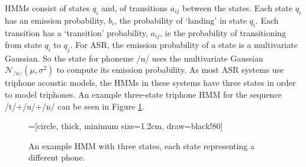 HMMs consist of states $q_i$ and, of transitions $a_{ij}$ between the states.  Each state $q_i$ has an emission probability, $b_i$, the probability of `landing' in state $q_i$. %
Each transition has a `transition' probability, $a_{ij}$, ie the probability of transitioning from state $q_i$ to $q_j$.  For ASR, the emission probability of a state is a multivariate Gaussian.  So the state for phoneme /u/ uses the multivariate Gaussian $\mathcal{N}_{/u/}(\mu,\sigma^2)$ to compute its emission probability.  As most ASR systems use triphone acoustic models, the HMMs in these systems have three states in order to model triphones.  An example three-state triphone HMM for the sequence /t/+/u/+/n/ can be seen in Figure \ref{fig:hmm-sounds}.  

\begin{figure}[htbp]
\centering
{}=[circle,
                                    thick,
                                    minimum size=1.2cm,
                                    draw=black!80]


\caption{An example HMM with three states, each state representing a different phone.}\label{fig:hmm-sounds}
\end{figure}

